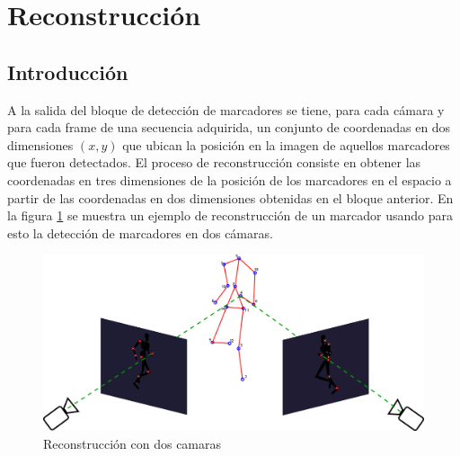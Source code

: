 


\section{Reconstrucción}
\subsection{Introducción}
A la salida del bloque de detección de marcadores se tiene, para cada cámara y para cada frame de una secuencia adquirida, un conjunto de coordenadas en dos dimensiones $(x,y)$ que ubican la posición en la imagen de aquellos marcadores que fueron detectados.
El proceso de reconstrucción consiste en obtener las coordenadas en tres dimensiones de la posición de los marcadores en el espacio a partir de las coordenadas en dos dimensiones obtenidas en el bloque anterior.
En la figura \ref{fig: esquema_reconstruccion} se muestra un ejemplo de reconstrucción de un marcador usando para esto la detección de marcadores en dos cámaras.\\

\begin{figure}[!ht]
\begin{center}
\includegraphics[scale=0.20]{img/Reconstruccion/ejemplo_reconstruccion.png}

\end{center}
\caption{Reconstrucción con dos camaras}
\label{fig: esquema_reconstruccion}
\end{figure}

